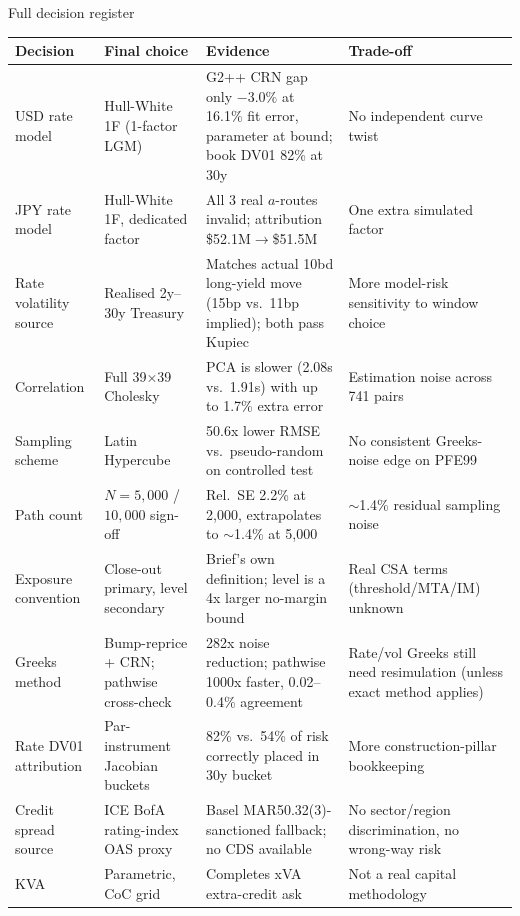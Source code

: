 \documentclass[8pt,aspectratio=169]{beamer}
\begin{document}
\begin{frame}{Full decision register}
  \tiny
  \begin{tabular}{p{}p{}p{}p{}}
    \toprule
    \textbf{Decision} & \textbf{Final choice} & \textbf{Evidence} & \textbf{Trade-off} \\
    \midrule
    USD rate model & Hull-White 1F (1-factor LGM) & G2++ CRN gap only $-3.0\%$ at 16.1\% fit error, parameter at bound; book DV01 82\% at 30y & No independent curve twist \\
    JPY rate model & Hull-White 1F, dedicated factor & All 3 real $a$-routes invalid; attribution \$52.1M$\to$\$51.5M & One extra simulated factor \\
    Rate volatility source & Realised 2y--30y Treasury & Matches actual 10bd long-yield move (15bp vs.\ 11bp implied); both pass Kupiec & More model-risk sensitivity to window choice \\
    Correlation & Full 39$\times$39 Cholesky & PCA is slower (2.08s vs.\ 1.91s) with up to 1.7\% extra error & Estimation noise across 741 pairs \\
    Sampling scheme & Latin Hypercube & 50.6x lower RMSE vs.\ pseudo-random on controlled test & No consistent Greeks-noise edge on PFE99 \\
    Path count & $N{=}5{,}000$ / $10{,}000$ sign-off & Rel.\ SE 2.2\% at 2,000, extrapolates to $\sim$1.4\% at 5,000 & $\sim$1.4\% residual sampling noise \\
    Exposure convention & Close-out primary, level secondary & Brief's own definition; level is a 4x larger no-margin bound & Real CSA terms (threshold/MTA/IM) unknown \\
    Greeks method & Bump-reprice + CRN; pathwise cross-check & 282x noise reduction; pathwise 1000x faster, 0.02--0.4\% agreement & Rate/vol Greeks still need resimulation (unless exact method applies) \\
    Rate DV01 attribution & Par-instrument Jacobian buckets & 82\% vs.\ 54\% of risk correctly placed in 30y bucket & More construction-pillar bookkeeping \\
    Credit spread source & ICE BofA rating-index OAS proxy & Basel MAR50.32(3)-sanctioned fallback; no CDS available & No sector/region discrimination, no wrong-way risk \\
    KVA & Parametric, CoC grid & Completes xVA extra-credit ask & Not a real capital methodology \\
    \bottomrule
  \end{tabular}
\end{frame}
\end{document}
